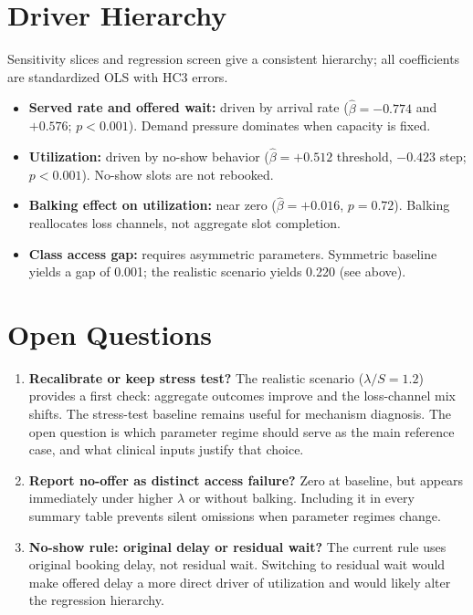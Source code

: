 \documentclass[10pt]{article}
\begin{document}
\section*{Driver Hierarchy}

Sensitivity slices and regression screen give a consistent hierarchy;
all coefficients are standardized OLS with HC3 errors.

\begin{itemize}
  \item \textbf{Served rate and offered wait:} driven by arrival rate
    (\(\hat{\beta}=-0.774\) and \(+0.576\); \(p<0.001\)).
    Demand pressure dominates when capacity is fixed.
  \item \textbf{Utilization:} driven by no-show behavior
    (\(\hat{\beta}=+0.512\) threshold, \(-0.423\) step; \(p<0.001\)).
    No-show slots are not rebooked.
  \item \textbf{Balking effect on utilization:} near zero
    (\(\hat{\beta}=+0.016\), \(p=0.72\)). Balking reallocates loss
    channels, not aggregate slot completion.
  \item \textbf{Class access gap:} requires asymmetric parameters.
    Symmetric baseline yields a gap of 0.001; the realistic scenario
    yields 0.220 (see above).
\end{itemize}

\section*{Open Questions}

\begin{enumerate}
  \item \textbf{Recalibrate or keep stress test?}
    The realistic scenario (\(\lambda/S=1.2\)) provides a first check:
    aggregate outcomes improve and the loss-channel mix shifts. The
    stress-test baseline remains useful for mechanism diagnosis. The open
    question is which parameter regime should serve as the main reference
    case, and what clinical inputs justify that choice.

  \item \textbf{Report no-offer as distinct access failure?}
    Zero at baseline, but appears immediately under higher \(\lambda\) or
    without balking. Including it in every summary table prevents silent
    omissions when parameter regimes change.

  \item \textbf{No-show rule: original delay or residual wait?}
    The current rule uses original booking delay, not residual wait.
    Switching to residual wait would make offered delay a more direct
    driver of utilization and would likely alter the regression hierarchy.
\end{enumerate}
\end{document}

